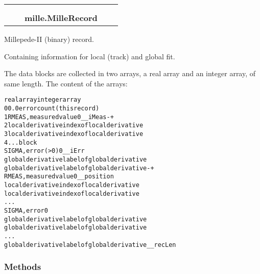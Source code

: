     \label{mille:MilleRecord}
\begin{tabular}{cccccc}
\multicolumn{2}{r}{\settowidth{\BCL}{object}\multirow{2}{\BCL}{object}}
&&
  \\\cline{3-3}
  &&\multicolumn{1}{c|}{}
&&
  \\
&&\multicolumn{2}{l}{\textbf{mille.MilleRecord}}
\end{tabular}

Millepede-II (binary) record.

Containing information for local (track) and global fit.

The data blocks are collected in two arrays, a real array and an integer 
array, of same length.  The content of the arrays:

\begin{alltt}
      real array              integer array    
  0   0.0                     error count (this record)  
  1   RMEAS, measured value   0                            \_\_iMeas   -+
  2   local derivative        index of local derivative               {\textbar}
  3   local derivative        index of local derivative               {\textbar}
  4    ...                                                            {\textbar} block
      SIGMA, error ({\textgreater}0)       0                            \_\_ iErr    {\textbar}
      global derivative       label of global derivative              {\textbar}
      global derivative       label of global derivative             -+
      RMEAS, measured value   0                            \_\_position
      local derivative        index of local derivative
      local derivative        index of local derivative
      ...
      SIGMA, error            0
      global derivative       label of global derivative
      global derivative       label of global derivative
      ...
      global derivative       label of global derivative   \_\_recLen\end{alltt}



  \subsubsection{Methods}

    \vspace{0.5ex}

